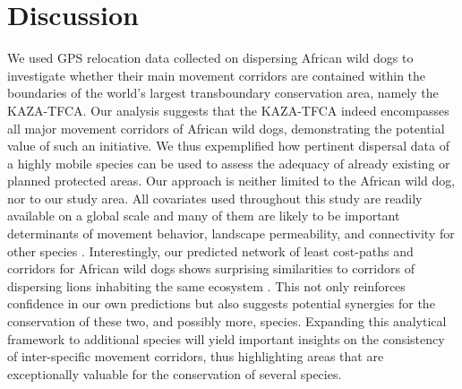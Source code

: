 \documentclass[abstract=on,10pt,a4paper,bibliography=totocnumbered]{article}
\begin{document}
\section{Discussion}
We used GPS relocation data collected on dispersing African wild dogs to
investigate whether their main movement corridors are contained within the
boundaries of the world's largest transboundary conservation area, namely the
KAZA-TFCA. Our analysis suggests that the KAZA-TFCA indeed encompasses all major
movement corridors of African wild dogs, demonstrating the potential value of
such an initiative. We thus expemplified how pertinent dispersal data of a
highly mobile species can be used to assess the adequacy of already existing or
planned protected areas. Our approach is neither limited to the African wild
dog, nor to our study area. All covariates used throughout this study are
readily available on a global scale and many of them are likely to be important
determinants of movement behavior, landscape permeability, and connectivity for
other species \citep{Thurfjell.2014, Zeller.2012}. Interestingly, our predicted
network of least cost-paths and corridors for African wild dogs shows surprising
similarities to corridors of dispersing lions inhabiting the same ecosystem
\citep{Elliot.2014, Cushman.2018}. This not only reinforces confidence in our
own predictions but also suggests potential synergies for the conservation of
these two, and possibly more, species. Expanding this analytical framework to
additional species will yield important insights on the consistency of
inter-specific movement corridors, thus highlighting areas that are
exceptionally valuable for the conservation of several species.
\end{document}
